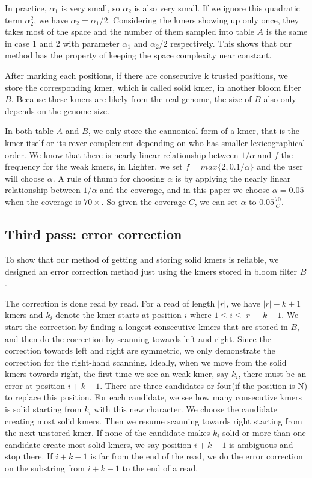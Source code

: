 \documentclass[10pt]{article}
\begin{document}
In practice, $\alpha_1$ is very small, so $\alpha_2$ is also very small. If we ignore this quadratic term $\alpha_2^2$, we have $\alpha_2=\alpha_1 / 2$. Considering the kmers showing up only once, they takes most of the space and the number of them sampled into table $A$ is the same in case 1 and 2 with parameter $\alpha_1$ and $\alpha_2/2$ respectively. This shows that our method has the property of keeping the space complexity near constant. 

After marking each positions, if there are consecutive k trusted positions, we store the corresponding kmer, which is called solid kmer, in another bloom filter $B$. Because these kmers are likely from the real genome, the size of $B$ also only depends on the genome size. 

In both table $A$ and $B$, we only store the cannonical form of a kmer, that is the kmer itself or its rever complement depending on who has smaller lexicographical order. We know that there is nearly linear relationship between $1/\alpha$ and $f$ the frequency for the weak kmers, in Lighter, we set $f=max\{2,0.1/\alpha\}$ and the user will choose $\alpha$. A rule of thumb for choosing $\alpha$ is by applying the nearly linear relationship between $1/\alpha$ and the coverage, and in this paper we choose $\alpha=0.05$ when the coverage is $70\times$. So given the coverage $C$, we can set $\alpha$ to $0.05\frac{70}{C}$. 

\subsection*{Third pass: error correction}
To show that our method of getting and storing solid kmers is reliable, we designed an error correction method just using the kmers stored in bloom filter $B$.

The correction is done read by read. For a read of length $|r|$, we have $|r|-k+1$ kmers and $k_i$ denote the kmer starts at position $i$ where $1\le i\le|r|-k+1$. We start the correction by finding a longest consecutive kmers that are stored in $B$, and then do the correction by scanning towards left and right. Since the correction towards left and right are symmetric, we only demonstrate the correction for the right-hand scanning. Ideally, when we move from the solid kmers towards right, the first time we see an weak kmer, say $k_i$, there must be an error at position $i+k-1$. There are three candidates or four(if the position is N) to replace this position. For each candidate, we see how many consecutive kmers is solid starting from $k_i$ with this new character. We choose the candidate creating most solid kmers. Then we resume scanning towards right starting from the next unstored kmer. If none of the candidate makes $k_i$ solid or more than one candidate create most solid kmers, we say position $i+k-1$ is ambiguous and stop there. If $i+k-1$ is far from the end of the read, we do the error correction on the substring from $i+k-1$ to the end of a read.
\end{document}
